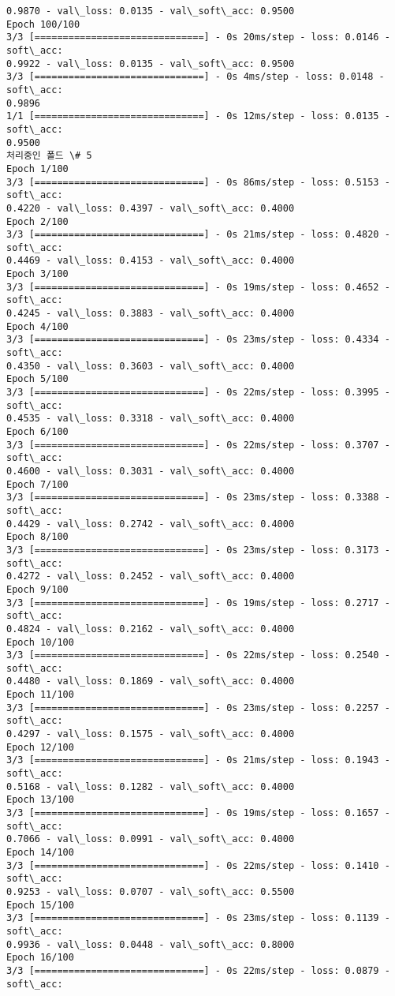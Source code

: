 \documentclass[11pt]{article}
\begin{document}
\begin{Verbatim}[commandchars=\\\{\}]
0.9870 - val\_loss: 0.0135 - val\_soft\_acc: 0.9500
Epoch 100/100
3/3 [==============================] - 0s 20ms/step - loss: 0.0146 - soft\_acc:
0.9922 - val\_loss: 0.0135 - val\_soft\_acc: 0.9500
3/3 [==============================] - 0s 4ms/step - loss: 0.0148 - soft\_acc:
0.9896
1/1 [==============================] - 0s 12ms/step - loss: 0.0135 - soft\_acc:
0.9500
처리중인 폴드 \# 5
Epoch 1/100
3/3 [==============================] - 0s 86ms/step - loss: 0.5153 - soft\_acc:
0.4220 - val\_loss: 0.4397 - val\_soft\_acc: 0.4000
Epoch 2/100
3/3 [==============================] - 0s 21ms/step - loss: 0.4820 - soft\_acc:
0.4469 - val\_loss: 0.4153 - val\_soft\_acc: 0.4000
Epoch 3/100
3/3 [==============================] - 0s 19ms/step - loss: 0.4652 - soft\_acc:
0.4245 - val\_loss: 0.3883 - val\_soft\_acc: 0.4000
Epoch 4/100
3/3 [==============================] - 0s 23ms/step - loss: 0.4334 - soft\_acc:
0.4350 - val\_loss: 0.3603 - val\_soft\_acc: 0.4000
Epoch 5/100
3/3 [==============================] - 0s 22ms/step - loss: 0.3995 - soft\_acc:
0.4535 - val\_loss: 0.3318 - val\_soft\_acc: 0.4000
Epoch 6/100
3/3 [==============================] - 0s 22ms/step - loss: 0.3707 - soft\_acc:
0.4600 - val\_loss: 0.3031 - val\_soft\_acc: 0.4000
Epoch 7/100
3/3 [==============================] - 0s 23ms/step - loss: 0.3388 - soft\_acc:
0.4429 - val\_loss: 0.2742 - val\_soft\_acc: 0.4000
Epoch 8/100
3/3 [==============================] - 0s 23ms/step - loss: 0.3173 - soft\_acc:
0.4272 - val\_loss: 0.2452 - val\_soft\_acc: 0.4000
Epoch 9/100
3/3 [==============================] - 0s 19ms/step - loss: 0.2717 - soft\_acc:
0.4824 - val\_loss: 0.2162 - val\_soft\_acc: 0.4000
Epoch 10/100
3/3 [==============================] - 0s 22ms/step - loss: 0.2540 - soft\_acc:
0.4480 - val\_loss: 0.1869 - val\_soft\_acc: 0.4000
Epoch 11/100
3/3 [==============================] - 0s 23ms/step - loss: 0.2257 - soft\_acc:
0.4297 - val\_loss: 0.1575 - val\_soft\_acc: 0.4000
Epoch 12/100
3/3 [==============================] - 0s 21ms/step - loss: 0.1943 - soft\_acc:
0.5168 - val\_loss: 0.1282 - val\_soft\_acc: 0.4000
Epoch 13/100
3/3 [==============================] - 0s 19ms/step - loss: 0.1657 - soft\_acc:
0.7066 - val\_loss: 0.0991 - val\_soft\_acc: 0.4000
Epoch 14/100
3/3 [==============================] - 0s 22ms/step - loss: 0.1410 - soft\_acc:
0.9253 - val\_loss: 0.0707 - val\_soft\_acc: 0.5500
Epoch 15/100
3/3 [==============================] - 0s 23ms/step - loss: 0.1139 - soft\_acc:
0.9936 - val\_loss: 0.0448 - val\_soft\_acc: 0.8000
Epoch 16/100
3/3 [==============================] - 0s 22ms/step - loss: 0.0879 - soft\_acc:

\end{Verbatim}
\end{document}
